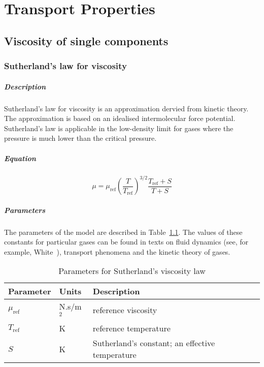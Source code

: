 \chapter{Transport Properties}
\label{chap:trans-prop}


\section{Viscosity of single components}

\subsection{Sutherland's law for viscosity}

\paragraph{Description}
Sutherland's law for viscosity is an approximation dervied from kinetic theory.
The approximation is based on an idealised intermolecular force
potential.
Sutherland's law is applicable in the low-density limit for gases where
the pressure is much lower than the critical pressure.

\paragraph{Equation}

\begin{equation}
\mu = \mu_{\text{ref}} \left(\frac{T}{T_{\text{ref}}}\right)^{3/2} \frac{T_{\text{ref}} + S}{T + S}
\end{equation}

\paragraph{Parameters}
The parameters of the model are described in Table~\ref{tab:Suth-visc}.
The values of these constants for particular gases can be found in texts
on fluid dynamics (see, for example, White~\cite{white_2006}), transport phenomena and the kinetic theory of gases.

\begin{table}[h]
\caption{Parameters for Sutherland's viscosity law}
\label{tab:Suth-visc}
\begin{tabular}{llp{10cm}}
\toprule
Parameter        & Units     & Description \\ \midrule
$\mu_{\text{ref}}$ & N.s/m$^2$ & reference viscosity \\
$T_{\text{ref}}$   & K         & reference temperature  \\
$S$              & K         & Sutherland's constant; an effective temperature \\
\bottomrule
\end{tabular}
\end{table}

